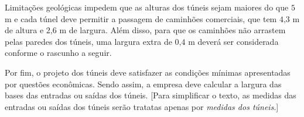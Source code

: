 \documentclass[10 pt,usenames,dvipsnames, oneside]{article}
\begin{document}
Limitações geológicas impedem que as alturas dos túneis sejam maiores do que \(5\) m e cada túnel deve permitir a passagem de caminhões comerciais, que tem \(4\text{,}3\) m de altura e \(2\text{,}6\) m de largura. Além disso, para que os caminhões não arrastem pelas paredes dos túneis, uma largura extra de \(0\text{,}4\) m deverá ser considerada conforme o rascunho a seguir.
\begin{center}\end{center}
Por fim, o projeto dos túneis deve satisfazer as condições mínimas apresentadas por questões econômicas. Sendo assim, a empresa deve calcular a largura das bases das entradas ou saídas dos túneis. {[}Para simplificar o texto, as medidas das entradas ou saídas dos túneis serão tratatas apenas por \textit{medidas dos túneis}.{]}
\end{document}

